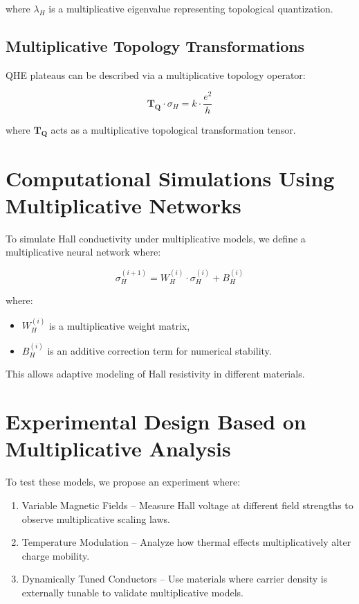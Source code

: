 \documentclass{article}
\theoremstyle{plain}
\begin{document}
where $\lambda_H$ is a multiplicative eigenvalue representing topological quantization.

\subsection{Multiplicative Topology Transformations}
QHE plateaus can be described via a multiplicative topology operator:

\begin{equation}
\mathbf{T_Q} \cdot \sigma_H = k \cdot \frac{e^2}{h}
\end{equation}

where $\mathbf{T_Q}$ acts as a multiplicative topological transformation tensor.

\section{Computational Simulations Using Multiplicative Networks}

To simulate Hall conductivity under multiplicative models, we define a multiplicative neural network where:

\begin{equation}
\sigma_{H}^{(i+1)} = W_H^{(i)} \cdot \sigma_H^{(i)} + B_H^{(i)}
\end{equation}

where:
\begin{itemize}
\item $W_H^{(i)}$ is a multiplicative weight matrix,
\item $B_H^{(i)}$ is an additive correction term for numerical stability.
\end{itemize}

This allows adaptive modeling of Hall resistivity in different materials.

\section{Experimental Design Based on Multiplicative Analysis}
To test these models, we propose an experiment where:
\begin{enumerate}
\item Variable Magnetic Fields – Measure Hall voltage at different field strengths to observe multiplicative scaling laws.
\item Temperature Modulation – Analyze how thermal effects multiplicatively alter charge mobility.
\item Dynamically Tuned Conductors – Use materials where carrier density is externally tunable to validate multiplicative models.
\end{enumerate}
\end{document}
